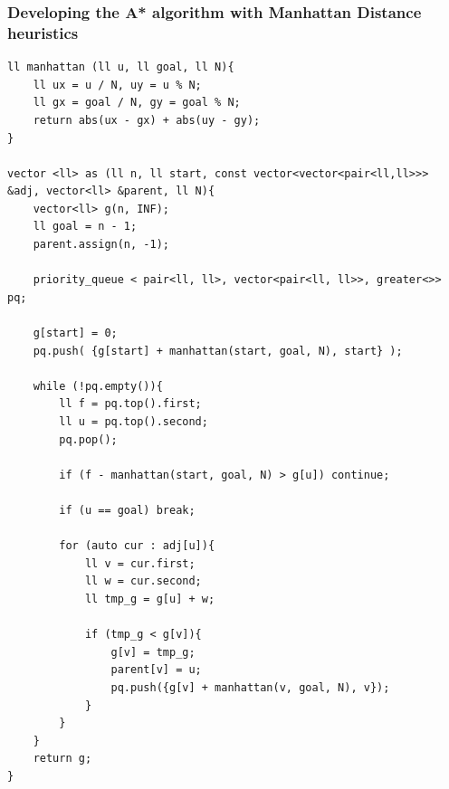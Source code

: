 \documentclass[a4paper,12pt]{article}
\begin{document}
\subsubsection{Developing the A* algorithm with Manhattan Distance heuristics}
\begin{tcolorbox}[breakable, enhanced, colback=white, title={Main Functions}, colframe=gray!40]
\begin{lstlisting}
ll manhattan (ll u, ll goal, ll N){
    ll ux = u / N, uy = u % N;
    ll gx = goal / N, gy = goal % N;
    return abs(ux - gx) + abs(uy - gy); 
}

vector <ll> as (ll n, ll start, const vector<vector<pair<ll,ll>>> &adj, vector<ll> &parent, ll N){
    vector<ll> g(n, INF);
    ll goal = n - 1; 
    parent.assign(n, -1);

    priority_queue < pair<ll, ll>, vector<pair<ll, ll>>, greater<>> pq; 

    g[start] = 0; 
    pq.push( {g[start] + manhattan(start, goal, N), start} );   

    while (!pq.empty()){ 
        ll f = pq.top().first; 
        ll u = pq.top().second;
        pq.pop();  

        if (f - manhattan(start, goal, N) > g[u]) continue;

        if (u == goal) break; 

        for (auto cur : adj[u]){
            ll v = cur.first;
            ll w = cur.second; 
            ll tmp_g = g[u] + w;  

            if (tmp_g < g[v]){
                g[v] = tmp_g; 
                parent[v] = u;
                pq.push({g[v] + manhattan(v, goal, N), v});
            }
        }
    }
    return g; 
}
\end{lstlisting}
\end{tcolorbox}
\vspace{1em}
\end{document}
